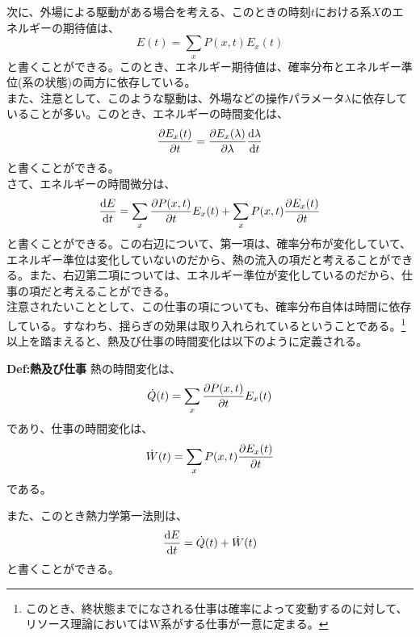 \documentclass[a4paper,11pt]{jsarticle}
\numberwithin{equation}{section}
\begin{document}
次に、外場による駆動がある場合を考える、このときの時刻$t$における系$X$のエネルギーの期待値は、
\begin{equation}
    E(t) = \sum_x P(x,t)E_x(t)
\end{equation}
と書くことができる。このとき、エネルギー期待値は、確率分布とエネルギー準位(系の状態)の両方に依存している。\\
また、注意として、このような駆動は、外場などの操作パラメータ$\lambda$に依存していることが多い。このとき、エネルギーの時間変化は、
\begin{equation}
    \pdv{E_x(t)}{t} = \pdv{E_x(\lambda)}{\lambda}\dv{\lambda}{t}
\end{equation}
と書くことができる。\\
さて、エネルギーの時間微分は、
\begin{equation}
    \dv{E}{t} = \sum_x \pdv{P(x,t)}{t}E_x(t) + \sum_x P(x,t)\pdv{E_x(t)}{t}
\end{equation}
と書くことができる。この右辺について、第一項は、確率分布が変化していて、エネルギー準位は変化していないのだから、熱の流入の項だと考えることができる。また、右辺第二項については、エネルギー準位が変化しているのだから、仕事の項だと考えることができる。\\
注意されたいこととして、この仕事の項についても、確率分布自体は時間に依存している。すなわち、揺らぎの効果は取り入れられているということである。\footnote{このとき、終状態までになされる仕事は確率によって変動するのに対して、リソース理論においてはW系がする仕事が一意に定まる。}
以上を踏まえると、熱及び仕事の時間変化は以下のように定義される。
\begin{itembox}[l]{\textbf{Def:熱及び仕事}}
    熱の時間変化は、
    \begin{equation}
        \dot{Q}(t) = \sum_x \pdv{P(x,t)}{t}E_x(t)
    \end{equation}
    であり、仕事の時間変化は、
    \begin{equation}
        \dot{W}(t) = \sum_x P(x,t)\pdv{E_x(t)}{t}
    \end{equation}
    である。
\end{itembox}
また、このとき熱力学第一法則は、
\begin{equation}
    \dv{E}{t} = \dot{Q}(t) + \dot{W}(t)
\end{equation}
と書くことができる。\\
\end{document}
